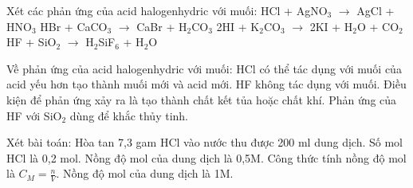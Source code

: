 \documentclass[Main.tex]{subfiles}
\begin{document}
    \begin{ex}
    Xét các phản ứng của acid halogenhydric với muối:
    \choiceTF
    {\True HCl + AgNO$_3$ $\rightarrow$ AgCl + HNO$_3$}
    {HBr + CaCO$_3$ $\rightarrow$ CaBr + H$_2$CO$_3$}
    {\True 2HI + K$_2$CO$_3$ $\rightarrow$ 2KI + H$_2$O + CO$_2$}
    {\True HF + SiO$_2$ $\rightarrow$ H$_2$SiF$_6$ + H$_2$O}
    \end{ex}
    
    \begin{ex}
    Về phản ứng của acid halogenhydric với muối:
    \choiceTF
    {\True HCl có thể tác dụng với muối của acid yếu hơn tạo thành muối mới và acid mới.}
    {HF không tác dụng với muối.}
    {\True Điều kiện để phản ứng xảy ra là tạo thành chất kết tủa hoặc chất khí.}
    {\True Phản ứng của HF với SiO$_2$ dùng để khắc thủy tinh.}
    \end{ex}
    
    \begin{ex}
    Xét bài toán: Hòa tan 7{,}3 gam HCl vào nước thu được 200 ml dung dịch.
    \choiceTF
    {\True Số mol HCl là 0{,}2 mol.}
    {Nồng độ mol của dung dịch là 0{,}5M.}
    {\True Công thức tính nồng độ mol là $C_M = \frac{n}{V}$.}
    {\True Nồng độ mol của dung dịch là 1M.}
    \end{ex}
    
\end{document}
